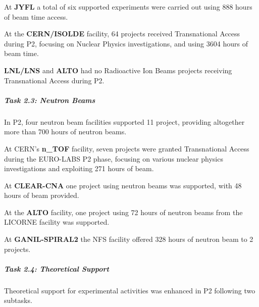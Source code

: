 At \textbf{JYFL} a total of six supported experiments were carried out using 888 hours of beam time access. %

At the \textbf{CERN/ISOLDE} facility, 64 projects received Transnational Access during P2, focusing on Nuclear Physics investigations, and using 3604 hours of beam time.

\textbf{LNL/LNS} and \textbf{ALTO} had no Radioactive Ion Beams projects receiving Transnational Access during P2.

\subparagraph{Task 2.3: Neutron Beams} \mbox{}


In P2, four neutron beam facilities supported 11 project, providing altogether more than 700 hours of neutron beams.

At CERN's \textbf{n\_TOF} facility, seven projects were granted Transnational Access during the EURO-LABS P2 phase, focusing on various nuclear physics investigations and exploiting 271 hours of beam.

At \textbf{CLEAR-CNA} one project using neutron beams was supported, with 48 hours of beam provided.

At the \textbf{ALTO} facility, one project using 72 hours of neutron beams from the LICORNE facility was supported.

At \textbf{GANIL-SPIRAL2} the NFS facility offered 328 hours of neutron beam to 2 projects.

\subparagraph{Task 2.4: Theoretical Support} \mbox{}


Theoretical support for experimental activities was enhanced in P2 following two subtasks. 


